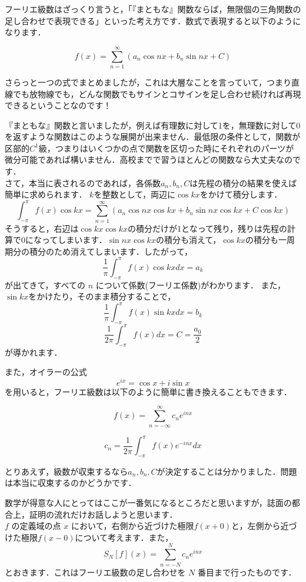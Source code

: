フーリエ級数はざっくり言うと，「『まともな』関数ならば，無限個の三角関数の足し合わせで表現できる」といった考え方です．数式で表現すると以下のようになります．

\[
  f(x) = \sum_{n=1}^\infty (a_n \cos nx + b_n \sin nx + C)
\]

さらっと一つの式でまとめましたが，これは大層なことを言っていて，つまり直線でも放物線でも，どんな関数でもサインとコサインを足し合わせ続ければ再現できるということなのです！

『まともな』関数と言いましたが，例えば有理数に対して1を，無理数に対して0を返すような関数はこのような展開が出来ません．最低限の条件として，関数が区部的$C^1$級，つまりはいくつかの点で関数を区切った時にそれぞれのパーツが微分可能であれば構いません．高校までで習うほとんどの関数なら大丈夫なのです．\\

さて，本当に表されるのであれば，各係数$a_n,b_n,C$は先程の積分の結果を使えば簡単に求められます．
$k$を整数として，両辺に$\cos kx$をかけて積分します．
\[
  \int_{-\pi}^\pi f(x) \cos kx = \sum_{n=1}^\infty (a_n \cos nx \cos kx+ b_n \sin nx \cos kx + C \cos kx)
\]
そうすると，右辺は$\cos kx \cos kx$の積分だけが1となって残り，残りは先程の計算で0になってしまいます．$\sin nx \cos kx$の積分も消えて，$\cos kx$の積分も一周期分の積分のため消えてしまいます．したがって，
\[
  \frac{1}{\pi} \int_{-\pi}^\pi f(x) \cos kx dx = a_k
\]
が出てきて，すべての $n$ について係数(フーリエ係数)がわかります．
また，$\sin kx$をかけたり，そのまま積分することで，
\[
  \frac{1}{\pi} \int_{-\pi}^\pi f(x) \sin kx dx = b_k
\]
\[
  \frac{1}{2 \pi} \int_{-\pi}^\pi f(x) dx = C = \frac{a_0}{2}
\]
が導かれます．

また，オイラーの公式
\[e^{ix} = \cos x + i \sin x\]
を用いると，フーリエ級数は以下のように簡単に書き換えることもできます．

\[
  f(x) = \sum_{n=-\infty}^\infty c_n e^{inx}
\]

\[
  c_n = \frac{1}{2\pi} \int_{-\pi}^\pi f(x) e^{-inx} dx
\]

とりあえず，級数が収束するなら$a_n,b_n,C$が決定することは分かりました．問題は本当に収束するのかどうかです．

数学が得意な人にとってはここが一番気になるところだと思いますが，誌面の都合上，証明の流れだけお話しようと思います．\\

$f$ の定義域の点 $x$ において，右側から近づけた極限$f(x+0)$と，左側から近づけた極限$f(x-0)$について考えます．また，
\[
  S_N[f](x) = \sum_{n=-N}^N c_n e^{inx}
\]
とおきます．これはフーリエ級数の足し合わせを $N$ 番目まで行ったものです．

